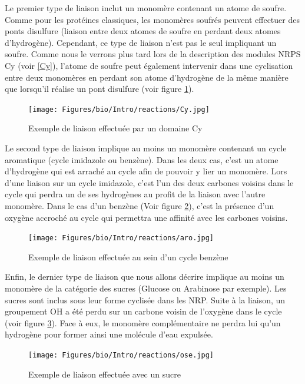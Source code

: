 Le premier type de liaison inclut un monomère contenant un atome de soufre.
Comme pour les protéines classiques, les monomères soufrés peuvent effectuer des ponts disulfure (liaison entre deux atomes de soufre en perdant deux atomes d'hydrogène).
Cependant, ce type de liaison n'est pas le seul impliquant un soufre.
Comme nous le verrons plus tard lors de la description des modules NRPS Cy (voir \ref{Cy}), l'atome de soufre peut également intervenir dans une cyclisation entre deux monomères en perdant son atome d'hydrogène de la même manière que lorsqu'il réalise un pont disulfure (voir figure \ref{Cy_link}).

\begin{figure}[h!]
  \begin{center}
    \texttt{[image: Figures/bio/Intro/reactions/Cy.jpg]}
    \caption{\label{Cy_link}Exemple de liaison effectuée par un domaine Cy}
  \end{center}
\end{figure}

Le second type de liaison implique au moins un monomère contenant un cycle aromatique (cycle imidazole ou benzène).
Dans les deux cas, c'est un atome d'hydrogène qui est arraché au cycle afin de pouvoir y lier un monomère.
Lors d'une liaison sur un cycle imidazole, c'est l'un des deux carbones voisins dans le cycle qui perdra un de ses hydrogènes au profit de la liaison avec l'autre monomère.
Dans le cas d'un benzène (Voir figure \ref{benzene}), c'est la présence d'un oxygène accroché au cycle qui permettra une affinité avec les carbones voisins.

\begin{figure}[h!]
  \begin{center}
    \texttt{[image: Figures/bio/Intro/reactions/aro.jpg]}
    \caption{\label{benzene}Exemple de liaison effectuée au sein d'un cycle benzène}
  \end{center}
\end{figure}

Enfin, le dernier type de liaison que nous allons décrire implique au moins un monomère de la catégorie des sucres (Glucose ou Arabinose par exemple).
Les sucres sont inclus sous leur forme cyclisée dans les NRP.
Suite à la liaison, un groupement OH a été perdu sur un carbone voisin de l'oxygène dans le cycle (voir figure \ref{ose}).
Face à eux, le monomère complémentaire ne perdra lui qu'un hydrogène pour former ainsi une molécule d'eau expulsée.

\begin{figure}[h!]
  \begin{center}
    \texttt{[image: Figures/bio/Intro/reactions/ose.jpg]}
    \caption{\label{ose}Exemple de liaison effectuée avec un sucre}
  \end{center}
\end{figure}

